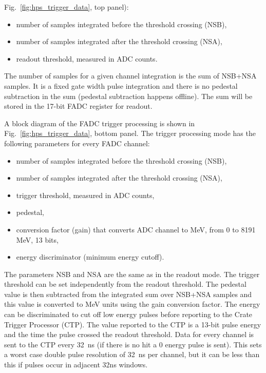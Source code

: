 Fig.~\ref{fig:hps_trigger_data}, top panel):
 \begin{itemize}
 \item number of samples integrated before the threshold crossing (NSB), 
 \item number of samples integrated after the  threshold crossing (NSA),
 \item readout threshold, measured in ADC counts.
 \end{itemize}
The number of samples for a given channel integration is the sum of NSB+NSA samples. It is a fixed gate width pulse integration and there is no pedestal subtraction in the sum (pedestal subtraction happens offline). The sum will be stored in the 17-bit FADC register for readout. 
 
A block diagram of the FADC trigger processing is shown in Fig.~\ref{fig:hps_trigger_data}, bottom panel. 
The trigger processing mode has the following parameters for every FADC channel:
 \begin{itemize}
 \item number of samples integrated before the threshold crossing (NSB),
 \item number of samples integrated after the  threshold crossing (NSA),
 \item trigger threshold, measured in ADC counts, 
 \item pedestal, 
 \item conversion factor (gain) that converts  ADC channel to MeV, from 0 to 8191 MeV, 13 bits, 
 \item energy discriminator (minimum energy cutoff).
 \end{itemize}
The parameters NSB and NSA are the same as in the readout mode. The trigger threshold can be set independently from the readout threshold.
The pedestal value is then subtracted from the integrated sum over NSB+NSA samples and this value is 
converted to MeV units using the gain conversion factor. The energy can be discriminated to cut off low 
energy pulses before reporting to the Crate Trigger Processor (CTP). 
The value reported to the CTP is a 13-bit pulse energy and the time the pulse crossed the readout threshold. 
Data for every channel is sent to the CTP every 32~ns (if there is no hit a 0 energy pulse is sent). 
This sets a worst case double pulse resolution of 32~ns per channel, but it can be less than this if pulses occur in adjacent 32ns windows.







